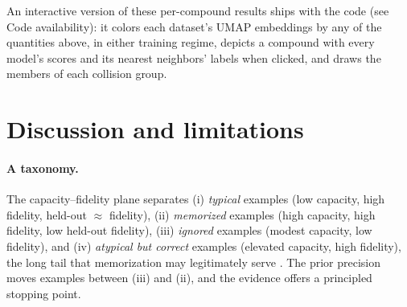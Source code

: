 \documentclass[10pt,twocolumn,letterpaper]{article}
\theoremstyle{definition}
\begin{document}
An interactive version of these per-compound results ships with the code (see Code availability): it colors each dataset's UMAP embeddings by any of the quantities above, in either training regime, depicts a compound with every model's scores and its nearest neighbors' labels when clicked, and draws the members of each collision group.

\section{Discussion and limitations}
\paragraph{A taxonomy.} The capacity--fidelity plane separates (i) \emph{typical} examples (low capacity, high fidelity, held-out $\approx$ fidelity), (ii) \emph{memorized} examples (high capacity, high fidelity, low held-out fidelity), (iii) \emph{ignored} examples (modest capacity, low fidelity), and (iv) \emph{atypical but correct} examples (elevated capacity, high fidelity), the long tail that memorization may legitimately serve \citep{feldman2020}. The prior precision moves examples between (iii) and (ii), and the evidence offers a principled stopping point.
\end{document}
